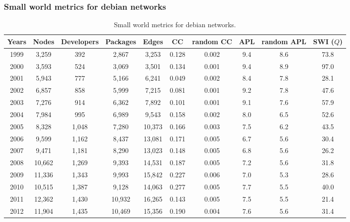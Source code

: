 \documentclass[ignorenonframetext,red,8pt,notes=hide]{beamer}
\begin{document}
\begin{frame}
\frametitle{Small world metrics for debian networks}
\begin{table}[H]
\begin{center}
\begin{footnotesize}
\begin{tabular}{|c|c|c|c|c|c|c|c|c|c|}
\hline
Years&Nodes&Developers&Packages&Edges&CC&random CC&APL&random APL&SWI ($Q$)\\
\hline
1999&3,259&392&2,867&3,253&0.128&0.002&9.4&8.6&73.8\\
2000&3,593&524&3,069&3,501&0.134&0.001&9.4&8.9&97.0\\
2001&5,943&777&5,166&6,241&0.049&0.002&8.4&7.8&28.1\\
2002&6,857&858&5,999&7,215&0.081&0.001&9.2&7.8&47.6\\
2003&7,276&914&6,362&7,892&0.101&0.001&9.1&7.6&57.9\\
2004&7,984&995&6,989&9,543&0.158&0.002&8.0&6.5&52.6\\
2005&8,328&1,048&7,280&10,373&0.166&0.003&7.5&6.2&43.5\\
2006&9,599&1,162&8,437&13,081&0.171&0.005&6.7&5.6&30.4\\
2007&9,471&1,181&8,290&13,023&0.148&0.005&6.8&5.6&26.2\\
2008&10,662&1,269&9,393&14,531&0.187&0.005&7.2&5.6&31.8\\
2009&11,336&1,343&9,993&15,842&0.227&0.006&7.0&5.3&28.6\\
2010&10,515&1,387&9,128&14,063&0.277&0.005&7.7&5.5&40.0\\
2011&12,362&1,430&10,932&16,265&0.143&0.005&7.5&5.5&21.4\\
2012&11,904&1,435&10,469&15,356&0.190&0.004&7.6&5.6&31.4\\
\hline
\end{tabular}
\caption{Small world metrics for debian networks.}
\label{swi_debian}
\end{footnotesize}
\end{center}
\end{table}


\end{frame}
\end{document}
